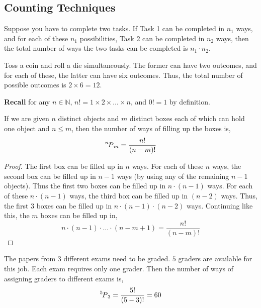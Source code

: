 \subsection{Counting Techniques}
Suppose you have to complete two tasks. If Task 1 can be completed in $n_1$
ways, and for each of these $n_1$ possibilities, Task 2 can be completed in
$n_2$ ways, then the total number of ways the two tasks can be completed is
$n_1 \cdot n_2$.
\begin{example}
Toss a coin and roll a die simultaneously. The former can have two outcomes,
and for each of these, the latter can have six outcomes. Thus, the total number
of possible outcomes is $2 \times 6 = 12$. 
\end{example}

\noindent \textbf{Recall} for any $n \in \mathbb{N}$, $n! = 1 \times 2 \times
\dots \times n$, and $0! = 1$ by definition. 

\begin{theorem}
    If we are given $n$ distinct objects and $m$ distinct boxes each of which
can hold one object and $n \leq m$, then the number of ways of filling up the
boxes is, 
\begin{equation*}
    \perm[n]{m} = \frac{n!}{(n - m)!}
\end{equation*}
\end{theorem}
\begin{proof}
    The first box can be filled up in $n$ ways. For each of these $n$ ways, the
second box can be filled up in $n - 1$ ways (by using any of the remaining $n
- 1$ objects). Thus the first two boxes can be filled up in $n \cdot (n - 1)$
ways. For each of these $n \cdot (n - 1)$ ways, the third box can be filled up
in $(n - 2)$ ways. Thus, the first $3$ boxes can be filled up in $n \cdot (n -
1) \cdot (n - 2)$ ways. Continuing like this, the $m$ boxes can be filled up
in, 
\begin{equation*}
    n \cdot (n-1) \cdot \dots \cdot (n - m + 1) = \frac{n!}{(n - m)!}
\end{equation*}
\end{proof}

\begin{example}
The papers from $3$ different exams need to be graded. $5$ graders are
available for this job. Each exam requires only one grader. Then the number of
ways of assigning graders to different exams is, 
\begin{equation*}
    \perm[5]{3} = \frac{5!}{(5 - 3)!} = 60
\end{equation*}
\end{example}


